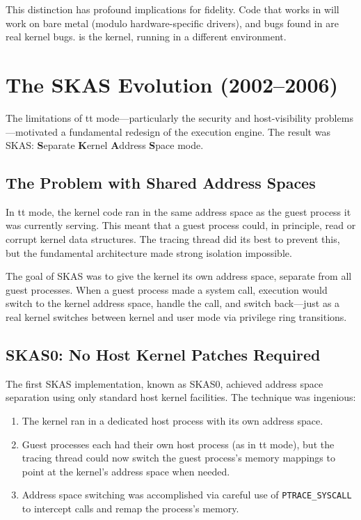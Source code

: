 This distinction has profound implications for fidelity.  Code that works in
\UML{} will work on bare metal (modulo hardware-specific drivers), and bugs found
in \UML{} are real kernel bugs.  \UML{} is the kernel, running in a different
environment.

\section{The SKAS Evolution (2002--2006)}
\label{sec:history-skas}

The limitations of tt mode---particularly the security and host-visibility
problems---motivated a fundamental redesign of the execution engine.  The
result was SKAS: \textbf{S}eparate \textbf{K}ernel \textbf{A}ddress
\textbf{S}pace mode.

\subsection{The Problem with Shared Address Spaces}
\label{sec:history-skas-problem}

In tt mode, the \UML{} kernel code ran in the same address space as the
guest process it was currently serving.  This meant that a guest process
could, in principle, read or corrupt kernel data structures.  The tracing
thread did its best to prevent this, but the fundamental architecture made
strong isolation impossible.

The goal of SKAS was to give the \UML{} kernel its own address space,
separate from all guest processes.  When a guest process made a system call,
execution would switch to the kernel address space, handle the call, and
switch back---just as a real kernel switches between kernel and user mode
via privilege ring transitions.

\subsection{SKAS0: No Host Kernel Patches Required}
\label{sec:history-skas0}

The first SKAS implementation, known as SKAS0, achieved address space
separation using only standard host kernel facilities.  The technique was
ingenious:

\begin{enumerate}[nosep]
  \item The \UML{} kernel ran in a dedicated host process with its own
    address space.
  \item Guest processes each had their own host process (as in tt mode),
    but the tracing thread could now switch the guest process's memory
    mappings to point at the kernel's address space when needed.
  \item Address space switching was accomplished via careful use of
    \texttt{PTRACE\_SYSCALL} to intercept  calls and remap
    the process's memory.
\end{enumerate}

